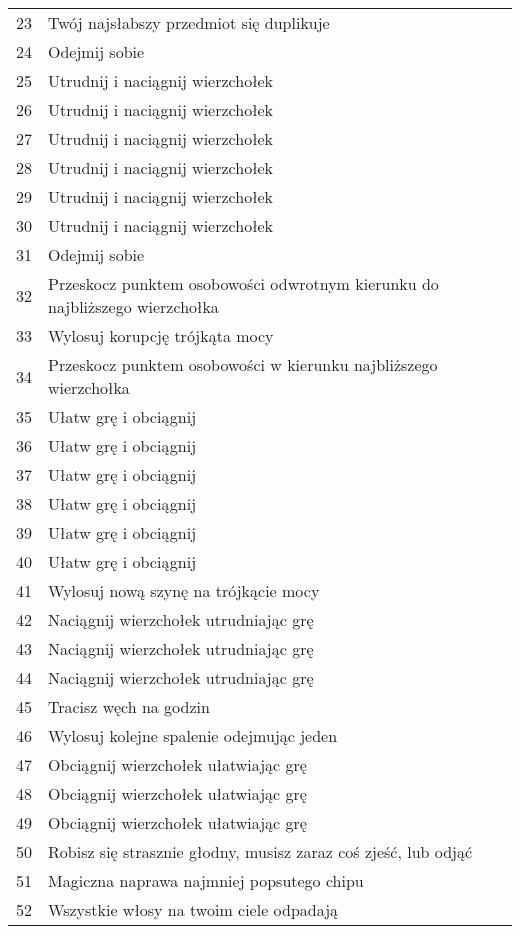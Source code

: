 \begin{longtabu}{ l l }
23			&	Twój najsłabszy przedmiot się duplikuje \\
24			&	Odejmij sobie \diiii \abkar	\\
25			&	Utrudnij i naciągnij wierzchołek \abi \\
26			&	Utrudnij i naciągnij wierzchołek \abh \\
27			&	Utrudnij i naciągnij wierzchołek \aba \\
28			&	Utrudnij i naciągnij wierzchołek \abt \\
29			&	Utrudnij i naciągnij wierzchołek \abp \\
30			&	Utrudnij i naciągnij wierzchołek \abs \\
31			&	Odejmij sobie \diiii \abzyc \\
32			&	Przeskocz punktem osobowości odwrotnym kierunku do najbliższego wierzchołka \\
33			&	Wylosuj korupcję trójkąta mocy 	\\
34			&	Przeskocz punktem osobowości w kierunku najbliższego wierzchołka \\
35			&	Ułatw grę i obciągnij \abp \\
36			&	Ułatw grę i obciągnij \abt \\
37			&	Ułatw grę i obciągnij \abh \\
38			&	Ułatw grę i obciągnij \abi \\
39			&	Ułatw grę i obciągnij \abs \\
40			&	Ułatw grę i obciągnij \aba \\
41			&	Wylosuj nową szynę na trójkącie mocy \\
42			&	Naciągnij wierzchołek \absm utrudniając grę \\
43			&	Naciągnij wierzchołek \abdm utrudniając grę \\
44			&	Naciągnij wierzchołek \abrm utrudniając grę \\
45			&	Tracisz węch na \dc godzin \\
46			&	Wylosuj kolejne spalenie odejmując jeden \abkar \\
47			&	Obciągnij wierzchołek \abdm ułatwiając grę \\
48			&	Obciągnij wierzchołek \absm	ułatwiając grę \\
49			&	Obciągnij wierzchołek \absm	ułatwiając grę \\
50			&	Robisz się strasznie głodny, musisz zaraz coś zjeść, lub odjąć \abzyc \\
51			&	Magiczna naprawa najmniej popsutego chipu \\
52			&	Wszystkie włosy na twoim ciele odpadają \\

\end{longtabu}
